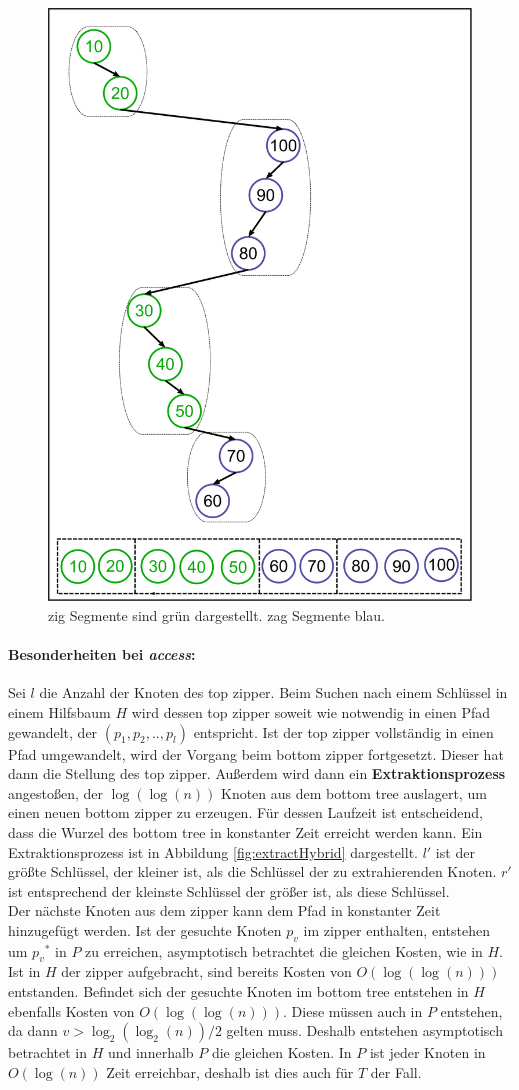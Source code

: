\documentclass[a4paper,12pt]{article}
\begin{document}
\begin{figure}[H]
	\centering
	\includegraphics[height= 0.7\textwidth]{"Medien/Zipper/preferredPathZigZag"}
	\caption{zig Segmente sind grün dargestellt. zag Segmente blau. }
	\label{fig:preferredPathZigZag}
\end{figure}

\paragraph{Besonderheiten bei \textit{access}:}
Sei $l$ die Anzahl der Knoten des top zipper.
Beim Suchen nach einem Schlüssel in einem Hilfsbaum $H$ wird dessen top zipper soweit wie notwendig in einen Pfad gewandelt, der $\left(p_1, p_2, .., p_l\right)$ entspricht. Ist der top zipper vollständig in einen Pfad umgewandelt, wird der Vorgang beim bottom zipper fortgesetzt. Dieser hat dann die Stellung des top zipper. Außerdem wird dann ein \textbf{Extraktionsprozess} angestoßen, der $\log\left(\log\left(n\right)\right)$ Knoten aus dem bottom tree auslagert, um einen neuen bottom zipper zu erzeugen. Für dessen Laufzeit ist entscheidend, dass die Wurzel des bottom tree in konstanter Zeit erreicht werden kann. Ein Extraktionsprozess ist in Abbildung \ref{fig:extractHybrid} dargestellt. $l'$ ist der größte Schlüssel, der kleiner ist, als die Schlüssel der zu extrahierenden Knoten. $r'$ ist entsprechend der kleinste Schlüssel der größer ist, als diese Schlüssel.  \\
Der nächste Knoten aus dem zipper kann dem Pfad in konstanter Zeit hinzugefügt werden. Ist der gesuchte Knoten $p_v$  im zipper enthalten, entstehen um ${p_v}^*$ in  $P$ zu erreichen, asymptotisch betrachtet die gleichen Kosten, wie in $H$. Ist in $H$ der zipper aufgebracht, sind bereits Kosten von $O\left(\log\left(\log\left(n\right)\right)\right)$ entstanden. Befindet sich der gesuchte Knoten im  bottom tree entstehen in $H$ ebenfalls Kosten von  $O\left(\log\left(\log\left(n\right)\right)\right)$. Diese müssen auch in $P$ entstehen, da dann $v > \log_2\left(\log_2\left(n\right)\right) /2$  gelten muss. Deshalb entstehen asymptotisch betrachtet in $H$ und innerhalb $P$ die gleichen Kosten. In $P$ ist jeder Knoten in $O\left(\log\left(n\right)\right)$ Zeit erreichbar, deshalb ist dies auch für  $T$ der Fall. 
\end{document}

